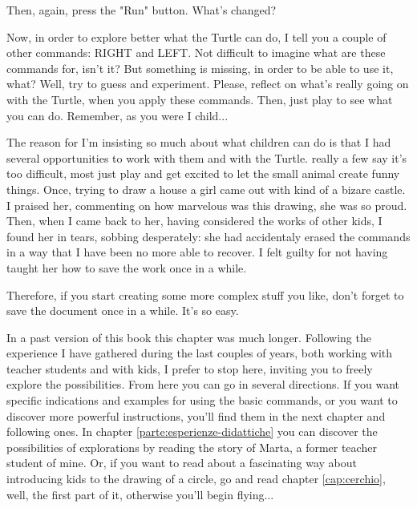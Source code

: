 \vskip 1cm

Then, again, press the "Run" button. What's changed? 

Now, in order to explore better what the Turtle can do, I tell you a couple of other commands: RIGHT and LEFT. Not difficult to imagine what are these commands for, isn't it? But something is missing, in order to be able to use it, what? Well, try to guess and experiment. Please, reflect on what's really going on with the Turtle, when you apply these commands. Then, just play to see what you can do. Remember, as you were I child...

The reason for I'm insisting so much about what children can do is that I had several opportunities to work with them and with the Turtle. really a few say it's too difficult, most just play and get excited to let the small animal create funny things. Once, trying to draw a house a girl came out with kind of a bizare castle. I praised her, commenting on how marvelous was this drawing, she was so proud. Then, when I came back to her, having considered the works of other kids, I found her in tears, sobbing desperately: she had accidentaly erased the commands in a way that I have been no more able to recover. I felt guilty for not having taught her how to save the work once in a while.

Therefore, if you start creating some more complex stuff you like, don't forget to save the document once in a while. It's so easy.

In a past version of this book this chapter was much longer. Following the experience I have gathered during the last couples of years, both working with teacher students and with kids, I prefer to stop here, inviting you to freely explore the possibilities. From here you can go in several directions. If you want specific indications and examples for using the basic commands, or you want to discover more powerful instructions, you'll find them in the next chapter and following ones.  In chapter \ref{parte:esperienze-didattiche} you can discover the possibilities of explorations by reading the story of Marta, a former teacher student of mine. Or, if you want to read about a fascinating way about introducing kids to the drawing of a circle, go and read chapter \ref{cap:cerchio}, well, the first part of it, otherwise you'll begin flying...
 


